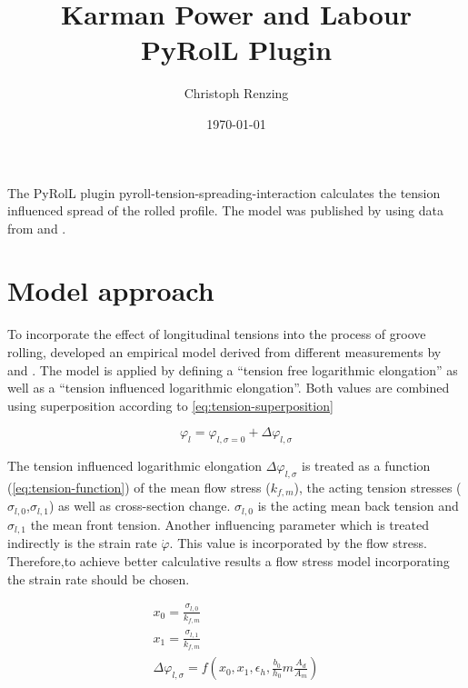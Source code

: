 \documentclass[11pt]{PyRollDocs}
\begin{document}
    \title{Karman Power and Labour PyRolL Plugin}
    \author{Christoph Renzing}
    \date{\today}

    \maketitle

    The PyRolL plugin pyroll-tension-spreading-interaction calculates the tension influenced spread of the rolled profile.
    The model was published by \textcite{Dobler1998, MaukDobler1999} using data from \textcite{Nikkilä1977} and \textcite{Treis1968}.


    \section{Model approach}\label{sec:model-approach}
    To incorporate the effect of longitudinal tensions into the process of groove rolling, \textcite{Dobler1998} developed an empirical model derived from different measurements by \textcite{Nikkilä1977} and \textcite{Treis1968}.
    The model is applied by defining a \enquote{tension free logarithmic elongation} as well as a \enquote{tension influenced logarithmic elongation}.
    Both values are combined using superposition according to \autoref{eq:tension-superposition}

    \begin{equation}
        \varphi_l = \varphi_{l, \sigma=0} + \Delta\varphi_{l, \sigma}
        \label{eq:tension-superposition}
    \end{equation}

    The tension influenced logarithmic elongation $\Delta\varphi_{l, \sigma}$ is treated as a function (\autoref{eq:tension-function}) of the mean flow stress ($k_{f,m}$), the acting tension stresses ($\sigma_{l,0}$,$\sigma_{l,1}$) as well as cross-section change.
    $\sigma_{l,0}$ is the acting mean back tension and $\sigma_{l,1}$ the mean front tension.
    Another influencing parameter which is treated indirectly is the strain rate $\dot{\varphi}$.
    This value is incorporated by the flow stress.
    Therefore,to achieve better calculative results a flow stress model incorporating the strain rate should be chosen.

    \begin{gather}
        x_0 = \frac{\sigma_{l, 0}}{k_{f,m}}\\
        x_1 = \frac{\sigma_{l, 1}}{k_{f,m}}\\
        \Delta\varphi_{l, \sigma} = f \left( x_0, x_1, \epsilon_h, \frac{b_0}{h_0}m \frac{A_d}{A_m} \right)
    \end{gather}
\end{document}
